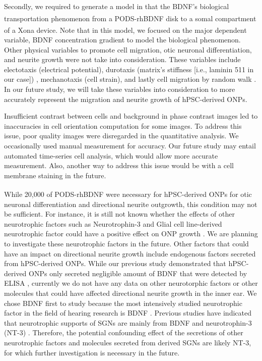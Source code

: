 \documentclass[review]{elsarticle}
\begin{document}
\indent Secondly, we required to generate a model in that the BDNF's biological transportation phenomenon from a PODS\textsuperscript{\textregistered}-rhBDNF disk to a somal compartment of a Xona\textsuperscript{\texttrademark} device. Note that in this model, we focused on the major dependent variable, BDNF concentration gradient to model the biological phenomenon. Other physical variables to promote cell migration, otic neuronal differentiation, and neurite growth were not take into consideration. These variables include electotaxis (electrical potential), durotaxis (matrix's stiffness [i.e., laminin 511 in our case]) \cite{Gentile2016}, mechanotaxis (cell strain), and lastly cell migration by random walk \cite{berg1983}. In our future study, we will take these variables into consideration to more accurately represent the migration and neurite growth of hPSC-derived ONPs. 

\indent Insufficient contrast between cells and background in phase contrast images led to inaccuracies in cell orientation computation for some images. To address this issue, poor quality images were disregarded in the quantitative analysis. We occasionally used manual measurement for accuracy. Our future study may entail automated time-series cell analysis, which would allow more accurate measurement. Also, another way to address this issue would be with a cell membrane staining in the future. 

\indent While 20,000 of PODS\textsuperscript{\textregistered}-rhBDNF were necessary for hPSC-derived ONPs for otic neuronal differentiation and directional neurite outgrowth, this condition may not be sufficient. For instance, it is still not known whether the effects of other neurotrophic factors such as Neurotrophin-3 and Glial cell line-derived neurotrophic factor could have a positive effect on ONP growth \cite{green2012, li2017, Schulze2020}. We are planning to investigate these neurotrophic factors in the future. Other factors that could have an impact on directional neurite growth include endogenous factors secreted from hPSC-derived ONPs. While our previous study demonstrated that hPSC-derived ONPs only secreted negligible amount of BDNF that were detected by ELISA \cite{Chang2020}, currently we do not have any data on other neurotorphic factors or other molecules that could have affected directional neurite growth in the inner ear. We chose BDNF first to study because the most intensively studied neurotrophic factor in the field of hearing research is BDNF \cite{green2012}. Previous studies have indicated that neurotrophic supports of SGNs are mainly from BDNF and neurotrophin-3 (NT-3) \cite{green2012,Sasi2017}. Therefore, the potential confounding effect of the secretions of other neurotrophic factors and molecules secreted from derived SGNs are likely NT-3, for which further investigation is necessary in the future.  
\end{document}
